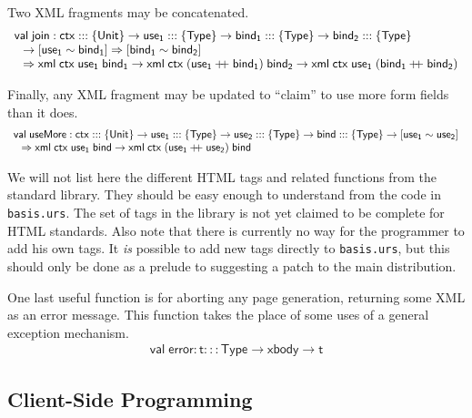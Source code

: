 \documentclass{article}
\newcommand{\mt}[1]{\mathsf{#1}}
\newcommand{\rc}{+ \hspace{-.075in} + \;}
\begin{document}
Two XML fragments may be concatenated.
$$\begin{array}{l}
  \mt{val} \; \mt{join} : \mt{ctx} ::: \{\mt{Unit}\} \to \mt{use_1} ::: \{\mt{Type}\} \to \mt{bind_1} ::: \{\mt{Type}\} \to \mt{bind_2} ::: \{\mt{Type}\} \\
  \hspace{.1in} \to [\mt{use_1} \sim \mt{bind_1}] \Rightarrow [\mt{bind_1} \sim \mt{bind_2}] \\
  \hspace{.1in} \Rightarrow \mt{xml} \; \mt{ctx} \; \mt{use_1} \; \mt{bind_1} \to \mt{xml} \; \mt{ctx} \; (\mt{use_1} \rc \mt{bind_1}) \; \mt{bind_2} \to \mt{xml} \; \mt{ctx} \; \mt{use_1} \; (\mt{bind_1} \rc \mt{bind_2})
\end{array}$$

Finally, any XML fragment may be updated to ``claim'' to use more form fields than it does.
$$\begin{array}{l}
  \mt{val} \; \mt{useMore} : \mt{ctx} ::: \{\mt{Unit}\} \to \mt{use_1} ::: \{\mt{Type}\} \to \mt{use_2} ::: \{\mt{Type}\} \to \mt{bind} ::: \{\mt{Type}\} \to [\mt{use_1} \sim \mt{use_2}] \\
  \hspace{.1in} \Rightarrow \mt{xml} \; \mt{ctx} \; \mt{use_1} \; \mt{bind} \to \mt{xml} \; \mt{ctx} \; (\mt{use_1} \rc \mt{use_2}) \; \mt{bind}
\end{array}$$

We will not list here the different HTML tags and related functions from the standard library.  They should be easy enough to understand from the code in \texttt{basis.urs}.  The set of tags in the library is not yet claimed to be complete for HTML standards.  Also note that there is currently no way for the programmer to add his own tags.  It \emph{is} possible to add new tags directly to \texttt{basis.urs}, but this should only be done as a prelude to suggesting a patch to the main distribution.

One last useful function is for aborting any page generation, returning some XML as an error message.  This function takes the place of some uses of a general exception mechanism.
$$\begin{array}{l}
  \mt{val} \; \mt{error} : \mt{t} ::: \mt{Type} \to \mt{xbody} \to \mt{t}
\end{array}$$


\subsection{Client-Side Programming}
\end{document}
